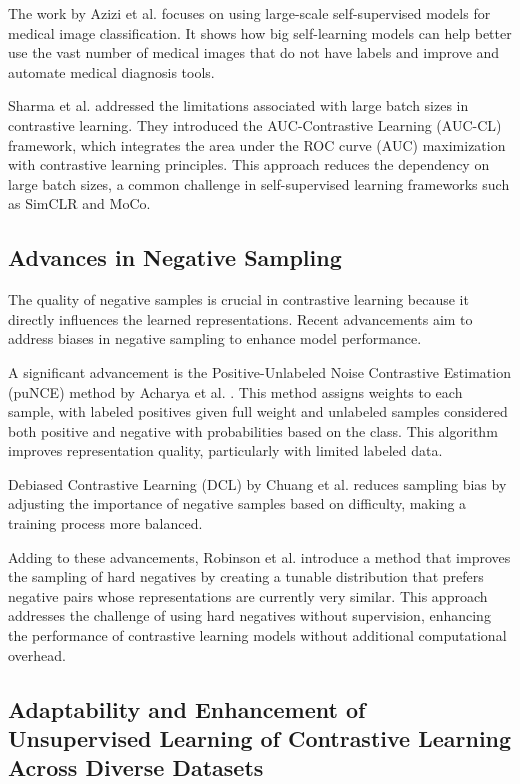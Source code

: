 The work by Azizi et al. \cite{azizi} focuses on using large-scale self-supervised models for medical image classification. It shows how big self-learning models can help better use the vast number of medical images that do not have labels and improve and automate medical diagnosis tools.

Sharma et al. \cite{sharma2023auc} addressed the limitations associated with large batch sizes in contrastive learning. They introduced the AUC-Contrastive Learning (AUC-CL) framework, which integrates the area under the ROC curve (AUC) maximization with contrastive learning principles. This approach reduces the dependency on large batch sizes, a common challenge in self-supervised learning frameworks such as SimCLR and MoCo.

\subsection{Advances in Negative Sampling}
The quality of negative samples is crucial in contrastive learning because it directly influences the learned representations. Recent advancements aim to address biases in negative sampling to enhance model performance.

A significant advancement is the Positive-Unlabeled Noise Contrastive Estimation (puNCE) method by Acharya et al. \cite{pucl}. This method assigns weights to each sample, with labeled positives given full weight and unlabeled samples considered both positive and negative with probabilities based on the class. This algorithm improves representation quality, particularly with limited labeled data.

Debiased Contrastive Learning (DCL) by Chuang et al. \cite{chuang2020debiased} reduces sampling bias by adjusting the importance of negative samples based on difficulty, making a training process more balanced.

Adding to these advancements, Robinson et al. \cite{robinson2020contrastive} introduce a method that improves the sampling of hard negatives by creating a tunable distribution that prefers negative pairs whose representations are currently very similar. This approach addresses the challenge of using hard negatives without supervision, enhancing the performance of contrastive learning models without additional computational overhead.

\subsection{Adaptability and Enhancement of Unsupervised Learning of Contrastive Learning Across Diverse Datasets}

